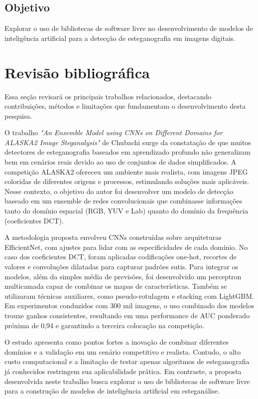 \documentclass[12pt]{article}
\begin{document}
\subsection{Objetivo}

Explorar o uso de bibliotecas de software livre no desenvolvimento de modelos de inteligência artificial para a detecção de esteganografia em imagens digitais.

\section{Revisão bibliográfica} \label{sec:firstpage}
Essa seção revisará os principais trabalhos relacionados, destacando contribuições, métodos e limitações que fundamentam o
desenvolvimento desta pesquisa.

O trabalho \textit{"An Ensemble Model using CNNs on Different Domains for ALASKA2 Image Steganalysis"} de Chubachi \cite{chubachi2020cnn} surge da constatação de que muitos detectores de esteganografia baseados em aprendizado profundo não generalizam bem em cenários reais devido ao uso de conjuntos de dados simplificados. A competição ALASKA2 ofereceu um ambiente mais realista, com imagens JPEG coloridas de diferentes origens e processos, estimulando soluções mais aplicáveis. Nesse contexto, o objetivo do autor foi desenvolver um modelo de detecção baseado em um ensemble de redes convolucionais que combinasse informações tanto do domínio espacial (RGB, YUV e Lab) quanto do domínio da frequência (coeficientes DCT).

A metodologia proposta envolveu CNNs construídas sobre arquiteturas EfficientNet, com ajustes para lidar com as especificidades de cada domínio. No caso dos coeficientes DCT, foram aplicadas codificações one-hot, recortes de valores e convoluções dilatadas para capturar padrões sutis. Para integrar os modelos, além da simples média de previsões, foi desenvolvido um perceptron multicamada capaz de combinar os mapas de características. Também se utilizaram técnicas auxiliares, como pseudo-rotulagem e stacking com LightGBM. Em experimentos conduzidos com 300 mil imagens, o uso combinado dos modelos trouxe ganhos consistentes, resultando em uma performance de AUC ponderado próxima de 0,94 e garantindo a terceira colocação na competição.

O estudo apresenta como pontos fortes a inovação de combinar diferentes domínios e a validação em um cenário competitivo e realista. Contudo, o alto custo computacional e a limitação de testar apenas algoritmos de esteganografia já conhecidos restringem sua aplicabilidade prática. Em contraste, a proposta desenvolvida neste trabalho busca explorar o uso de bibliotecas de software livre para a construção de modelos de inteligência artificial em esteganálise. 
\end{document}
